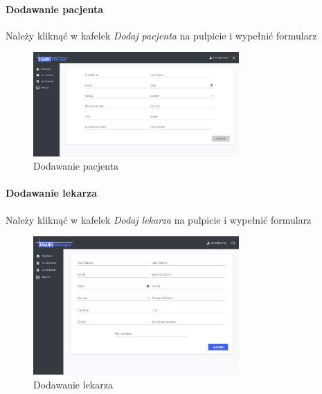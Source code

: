 \documentclass[polish,12pt]{aghthesis}
\begin{document}
    \paragraph{Dodawanie pacjenta}{
        Należy kliknąć w kafelek \emph{Dodaj pacjenta} na pulpicie i wypełnić formularz
        \begin{figure}[H]
          \includegraphics[width=0.7\textwidth]{gui-add-patient}
          \caption{Dodawanie pacjenta}
        \end{figure}     
    }
    \paragraph{Dodawanie lekarza}{
        Należy kliknąć w kafelek \emph{Dodaj lekarza} na pulpicie i wypełnić formularz
        \begin{figure}[H]
          \includegraphics[width=0.7\textwidth]{gui-add-doctor}
          \caption{Dodawanie lekarza}
        \end{figure}     
    }
\end{document}
